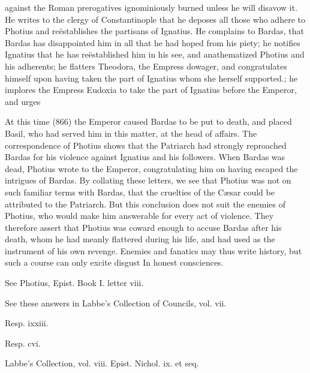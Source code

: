 against the Roman prerogatives ignominiously burned unless he will disavow it. He writes to the clergy of Constantinople that he deposes all those who adhere to Photius and reëstablishes the partisans of Ignatius. He complains to Bardas, that Bardas has disappointed him in all that he had hoped from his piety; he notifies Ignatius that he has reëstablished him in his see, and anathematized Photius and his adherents; he flatters Theodora, the Empress dowager, and congratulates himself upon having taken the part of Ignatius whom she herself supported.; he implores the Empress Eudoxia to take the part of Ignatius before the Emperor, and urges

At this time (866) the Emperor caused Bardas to be put to death, and placed Basil, who had served him in this matter, at the head of affairs. The correspondence of Photius shows that the Patriarch had strongly reproached Bardas for his violence against Ignatius and his followers. When Bardas was dead, Photius wrote to the Emperor, congratulating him on having escaped the intrigues of Bardas. By collating these letters, we see that Photius was not on such familiar terms with Bardas, that the cruelties of the Cæsar could be attributed to the Patriarch. But this conclusion does not suit the enemies of Photius, who would make him answerable for every act of violence. They therefore assert that Photius was coward enough to accuse Bardas after his death, whom he had meanly flattered during his life, and had used as the instrument of his own revenge. Enemies and fanatics may thus write history, but such a course can only excite disgust In honest consciences.

See Photius, Epist. Book I. letter viii.

See these answers in Labbe’s Collection of Councils, vol. vii.

Resp. ixxiii.

Resp. cvi.

Labbe’s Collection, vol. viii. Epist. Nichol. ix. et seq.

